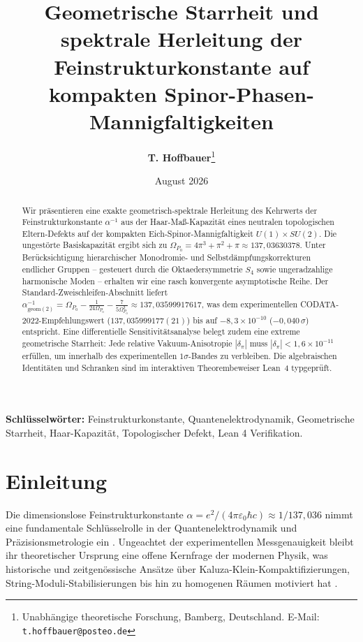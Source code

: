 \documentclass[11pt,a4paper]{article}
\title{\vspace{-1.0cm}\textbf{\Large Geometrische Starrheit und spektrale Herleitung der Feinstrukturkonstante auf kompakten Spinor-Phasen-Mannigfaltigkeiten}}
\author{\textbf{T. Hoffbauer}\thanks{Unabhängige theoretische Forschung, Bamberg, Deutschland. E-Mail: \texttt{t.hoffbauer@posteo.de}}}
\date{\small August 2026}
\begin{document}
\maketitle
\vspace{-0.5cm}

\begin{abstract}
\noindent Wir präsentieren eine exakte geometrisch-spektrale Herleitung des Kehrwerts der Feinstrukturkonstante $\alpha^{-1}$ aus der Haar-Maß-Kapazität eines neutralen topologischen Eltern-Defekts auf der kompakten Eich-Spinor-Mannigfaltigkeit $U(1) \times SU(2)$. Die ungestörte Basiskapazität ergibt sich zu $\Omega_{P_0} = 4\pi^3 + \pi^2 + \pi \approx 137{,}03630378$. Unter Berücksichtigung hierarchischer Monodromie- und Selbstdämpfungskorrekturen endlicher Gruppen -- gesteuert durch die Oktaedersymmetrie $S_4$ sowie ungeradzahlige harmonische Moden -- erhalten wir eine rasch konvergente asymptotische Reihe. Der Standard-Zweischleifen-Abschnitt liefert $\alpha_{\text{geom}(2)}^{-1} = \Omega_{P_0} - \frac{1}{24\Omega_{P_0}} - \frac{7}{5\Omega_{P_0}^3} \approx 137{,}03599917617$, was dem experimentellen CODATA-2022-Empfehlungswert ($137{,}035999177(21)$) bis auf $-8{,}3 \times 10^{-10}$ ($-0{,}040\,\sigma$) entspricht. Eine differentielle Sensitivitätsanalyse belegt zudem eine extreme geometrische Starrheit: Jede relative Vakuum-Anisotropie $|\delta_\pi|$ muss $|\delta_\pi| < 1{,}6 \times 10^{-11}$ erfüllen, um innerhalb des experimentellen $1\sigma$-Bandes zu verbleiben. Die algebraischen Identitäten und Schranken sind im interaktiven Theorembeweiser Lean~4 typgeprüft.
\end{abstract}

\vspace{0.2cm}
\noindent\textbf{Schlüsselwörter:} Feinstrukturkonstante, Quantenelektrodynamik, Geometrische Starrheit, Haar-Kapazität, Topologischer Defekt, Lean 4 Verifikation.

\section{Einleitung}
Die dimensionslose Feinstrukturkonstante $\alpha = e^2 / (4\pi \varepsilon_0 \hbar c) \approx 1/137{,}036$ nimmt eine fundamentale Schlüsselrolle in der Quantenelektrodynamik und Präzisionsmetrologie ein \cite{codata2022}. Ungeachtet der experimentellen Messgenauigkeit bleibt ihr theoretischer Ursprung eine offene Kernfrage der modernen Physik, was historische und zeitgenössische Ansätze über Kaluza-Klein-Kompaktifizierungen, String-Moduli-Stabilisierungen bis hin zu homogenen Räumen motiviert hat \cite{wyler1969, eddington1936, gross1985}.
\end{document}
